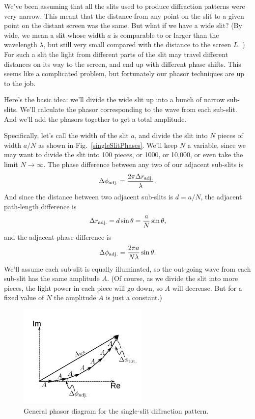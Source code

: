 We've been assuming that all the slits used to produce diffraction
patterns were very narrow. This meant that the distance from any point
on the slit to a given point on the distant screen was the same. But
what if we have a wide slit?  (By wide, we mean a slit whose width $a$
is comparable to or larger than the wavelength $\lambda$, but still very
small compared with the distance to the screen $L$. ) For such a slit the
light from different parts of the slit may travel different distances
on its way to the screen, and end up with different phase shifts.
This seems like a complicated problem, but fortunately our phasor
techniques are up to the job.

Here's the basic idea: we'll divide the wide slit up into a bunch of
narrow sub-slits.  We'll calculate the phasor corresponding to the
wave from each sub-slit. And we'll add the phasors together to get a
total amplitude.

Specifically, let's call the width of the slit $a$, and divide the
slit into $N$ pieces of width $a/N$
as shown in Fig.~\ref{singleSlitPhases}. We'll keep $N$ a variable, since
we may want to divide the slit into 100 pieces, or 1000, or 10,000, or
even take the limit $N\rightarrow\infty$.  The phase difference
between any two of our adjacent sub-slits is
\begin{equation}
\Delta\phi_{\rm adj.} = \frac{2\pi \Delta r_{\rm adj.}}{\lambda} .
\end{equation}
And since the distance between two adjacent sub-slits is $d=a/N$, 
the adjacent path-length difference is
\begin{equation}
\Delta r_{\rm adj.} = d\sin\theta= \frac{ a}{N} \sin\theta,
\end{equation} 
and the adjacent phase difference is
\begin{equation}
\Delta\phi_{\rm adj.} = \frac{2\pi a}{N\lambda}\sin\theta . 
\end{equation} 
We'll assume
each sub-slit is equally illuminated, so the out-going wave from each
sub-slit has the same amplitude $A$. (Of course, as we divide the slit
into more pieces, the light power in each piece will go down, so $A$
will decrease.  But for a fixed value of $N$ the amplitude $A$ is just
a constant.)

\begin{figure}[t]
\begin{center}\includegraphics[width=2.5in]{phasors/manySlitPhasorsGeneral}
\end{center}
\caption{\label{manySlitPhasorsGenFig}General phasor diagram for the
single-slit diffraction pattern.}
\end{figure}


